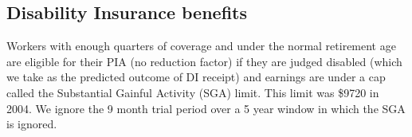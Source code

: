 \subsection{Disability Insurance benefits}
Workers with enough quarters of coverage and under the normal retirement age are eligible for their PIA (no reduction factor) if they are 
judged disabled (which we take as the predicted outcome of DI receipt) and earnings are under a cap called the Substantial Gainful Activity 
(SGA) limit. This limit was \$9720 in 2004. We ignore the 9 month trial period over a 5 year window in which the SGA is ignored.

